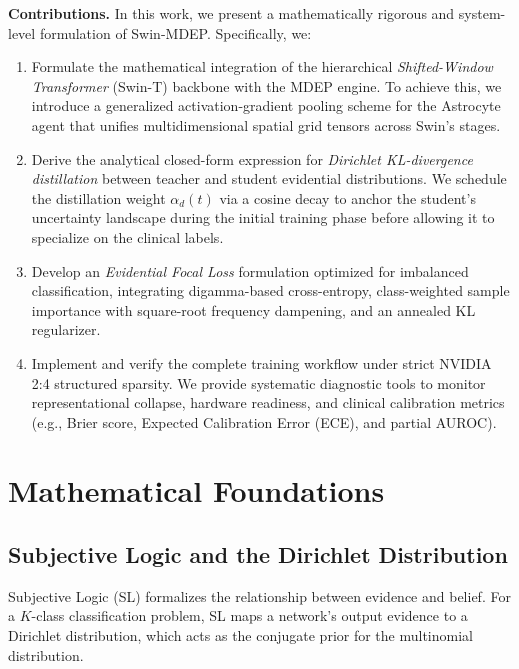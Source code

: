 \documentclass[11pt]{article}
\begin{document}
\textbf{Contributions.} In this work, we present a mathematically rigorous and system-level formulation of Swin-MDEP. Specifically, we:
\begin{enumerate}[label=(\arabic*)]
    \item Formulate the mathematical integration of the hierarchical \emph{Shifted-Window Transformer} (Swin-T) backbone with the MDEP engine. To achieve this, we introduce a generalized activation-gradient pooling scheme for the Astrocyte agent that unifies multidimensional spatial grid tensors across Swin's stages.
    \item Derive the analytical closed-form expression for \emph{Dirichlet KL-divergence distillation} between teacher and student evidential distributions. We schedule the distillation weight $\alpha_d(t)$ via a cosine decay to anchor the student's uncertainty landscape during the initial training phase before allowing it to specialize on the clinical labels.
    \item Develop an \emph{Evidential Focal Loss} formulation optimized for imbalanced classification, integrating digamma-based cross-entropy, class-weighted sample importance with square-root frequency dampening, and an annealed KL regularizer.
    \item Implement and verify the complete training workflow under strict NVIDIA 2:4 structured sparsity. We provide systematic diagnostic tools to monitor representational collapse, hardware readiness, and clinical calibration metrics (e.g., Brier score, Expected Calibration Error (ECE), and partial AUROC).
\end{enumerate}

\section{Mathematical Foundations}\label{sec:foundations}

\subsection{Subjective Logic and the Dirichlet Distribution}\label{subsec:dirichlet}

Subjective Logic (SL) formalizes the relationship between evidence and belief. For a $K$-class classification problem, SL maps a network's output evidence to a Dirichlet distribution, which acts as the conjugate prior for the multinomial distribution.
\end{document}
